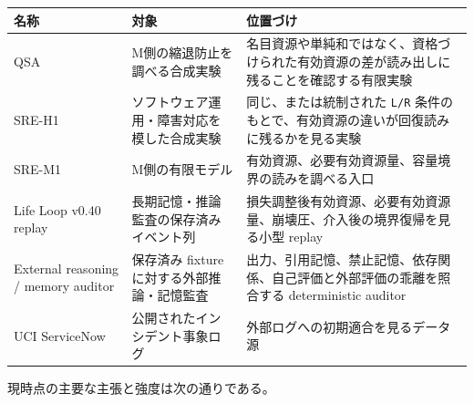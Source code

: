 \documentclass[12pt,a4paper]{article}
\begin{document}
{\def\LTcaptype{table} %
\begin{longtable}[]{@{}
  >{\raggedright\arraybackslash}p{}
  >{\raggedright\arraybackslash}p{}
  >{\raggedright\arraybackslash}p{}@{}}
\toprule\noalign{}
\begin{minipage}[b]{\linewidth}\raggedright
名称
\end{minipage} & \begin{minipage}[b]{\linewidth}\raggedright
対象
\end{minipage} & \begin{minipage}[b]{\linewidth}\raggedright
位置づけ
\end{minipage} \\
\midrule\noalign{}
\endhead
\bottomrule\noalign{}
\endlastfoot
QSA & M側の縮退防止を調べる合成実験 & 名目資源や単純和ではなく、資格づけられた有効資源の差が読み出しに残ることを確認する有限実験 \\
SRE-H1 & ソフトウェア運用・障害対応を模した合成実験 & 同じ、または統制された \texttt{L/R} 条件のもとで、有効資源の違いが回復読みに残るかを見る実験 \\
SRE-M1 & M側の有限モデル & 有効資源、必要有効資源量、容量境界の読みを調べる入口 \\
Life Loop v0.40 replay & 長期記憶・推論監査の保存済みイベント列 & 損失調整後有効資源、必要有効資源量、崩壊圧、介入後の境界復帰を見る小型 replay \\
External reasoning / memory auditor & 保存済み fixture に対する外部推論・記憶監査 & 出力、引用記憶、禁止記憶、依存関係、自己評価と外部評価の乖離を照合する deterministic auditor \\
UCI ServiceNow & 公開されたインシデント事象ログ & 外部ログへの初期適合を見るデータ源 \\
\end{longtable}
}

現時点の主要な主張と強度は次の通りである。
\end{document}
